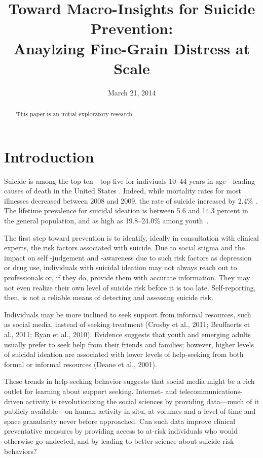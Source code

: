 \documentclass[11pt]{article}
\title{Toward Macro-Insights  for Suicide Prevention: \\ Anaylzing Fine-Grain Distress at Scale}
\date{March 21, 2014}
\begin{document}
\maketitle
\begin{abstract}

This paper is an initial exploratory research 
 \end{abstract}

\section{Introduction}


Suicide is among the top ten---top five for indiviuals 10--44 years in age---leading causes of death in the United States \cite{heron2009deaths}. Indeed, while mortality rates for most illnesses decreased between 2008 and 2009, the rate of suicide increased by 2.4\%  \cite{heron2009deaths}. The lifetime prevalence for suicidal ideation is between 5.6 and 14.3 percent in the general population, and as high as 19.8--24.0\% among youth~\cite{nock2008suicide}. 

The first step toward prevention is to identify, ideally in consultation with clinical experts, the risk factors associated with suicide.  Due to social stigma and the impact on self -judgement and -awareness due to such risk factors as depression or drug use, individuals with suicidal ideation may not always reach out to professionals or, if they do, provide them with accurate information. They may not even realize their own level of suicide risk before it is too late. Self-reporting, then, is not a reliable means of detecting and assessing suicide risk.

 Individuals may be more inclined to seek support from informal resources, such as social media, instead of seeking treatment (Crosby et al., 2011; Bruffaerts et al., 2011; Ryan et al., 2010). Evidence suggests that youth and emerging adults usually prefer to seek help from their friends and families; however, higher levels of suicidal ideation are associated with lower levels of help-seeking from both formal or informal resources (Deane et al., 2001).  

These trends in help-seeking behavior suggests that social media might be a rich outlet for learning about support seeking.
Internet- and telecommunications-driven activity is revolutionizing the social sciences by providing data---much of it publicly available---on human activity in situ, at volumes and a level of time and space granularity never before approached. Can such data improve clinical preventative measures by providing access to at-risk individuals who would otherwise go undected, and by leading to better science about suicide risk behaviors? 
\end{document}
